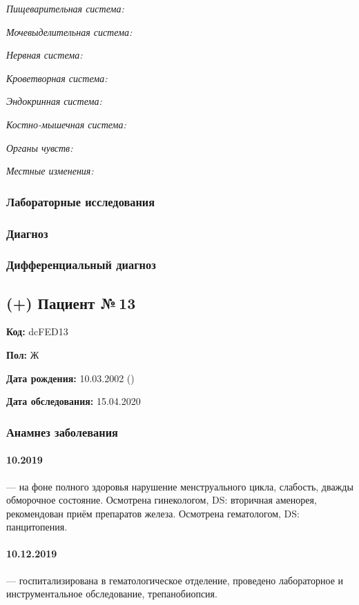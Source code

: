 \documentclass[a4paper,14pt]{extarticle}
\begin{document}
\emph{Пищеварительная система:}

\emph{Мочевыделительная система:}

\emph{Нервная система:} 

\emph{Кроветворная система:}

\emph{Эндокринная система:}

\emph{Костно-мышечная система:}

\emph{Органы чувств:}

\emph{Местные изменения:}

\subsubsection*{Лабораторные исследования}

\subsubsection*{Диагноз}

\subsubsection*{Дифференциальный диагноз}


\newpage
\subsection*{(+) Пациент №\,13}

\textbf{Код:} dcFED13

\textbf{Пол:} Ж

\textbf{Дата рождения:} 10.03.2002 ()

\textbf{Дата обследования:} 15.04.2020

\subsubsection*{Анамнез заболевания}

\paragraph{10.2019} --- на фоне полного здоровья нарушение менструального цикла, слабость, дважды обморочное состояние.
Осмотрена гинекологом, DS: вторичная аменорея, рекомендован приём препаратов железа.
Осмотрена гематологом, DS: панцитопения.
\paragraph{10.12.2019} --- госпитализирована в гематологическое отделение, проведено лабораторное и инструментальное обследование, трепанобиопсия.
\end{document}
